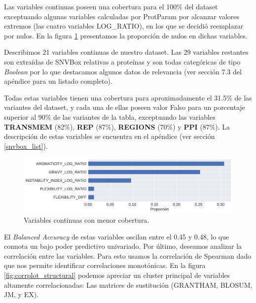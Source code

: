 Las variables continuas poseen una cobertura para el 100\% del dataset exceptuando algunas variables calculadas por ProtParam por alcanzar valores extremos (las cuatro variables LOG\_RATIO), en los que se decidió reemplazar por nulos. En la figura \ref{fig:proporcion_nulos_structural} presentamos la proporción de nulos en dichas variables.

Describimos 21 variables continuas de nuestro dataset. Las 29 variables restantes son extraídas de SNVBox relativas a proteínas y son todas categóricas de tipo \textit{Boolean} por lo que destacamos algunos datos de relevancia (ver sección 7.3 del apéndice para un listado completo). 

Todas estas variables tienen una cobertura para aproximadamente el 31.5\% de las variantes del dataset, y cada una de ellas poseen valor Falso para un porcentaje superior al 90\% de las variantes de la tabla, exceptuando las variables \textbf{TRANSMEM} (82\%), \textbf{REP} (87\%), \textbf{REGIONS} (70\%) y \textbf{PPI} (87\%). La descripción de estas variables se encuentra en el apéndice (ver sección \ref{snvbox_list}). 

\begin{figure}[H]
    \centering
    \includegraphics[scale=0.5]{documents/latex/figures/3/structural/proporcion_nulos_structural.pdf}
    \caption{Variables continuas con menor cobertura.}
    \label{fig:proporcion_nulos_structural}
\end{figure}

El \textit{Balanced Accuracy} de estas variables oscilan entre el 0.45 y 0.48, lo que connota un bajo poder predictivo univariado.
Por último, deseamos analizar la correlación entre las variables. Para esto usamos la correlación de Spearman dado que nos permite identificar correlaciones monotónicas. En la figura \ref{fig:corrplot_structural} podemos apreciar un cluster principal de variables altamente correlacionadas: Las matrices de sustitución (GRANTHAM, BLOSUM, JM, y EX).


